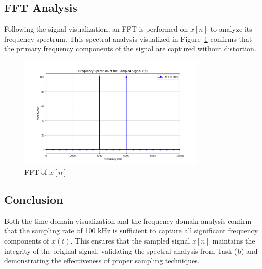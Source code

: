 \subsection*{FFT Analysis}
Following the signal visualization, an FFT is performed on $x[n]$ to analyze its frequency spectrum.
This spectral analysis visualized in Figure~\ref{fig:ex1c_fft_analysis} confirms that the primary frequency components of the signal are captured without distortion.

\begin{figure}[h]
    \centering
    \includegraphics[width=0.8\textwidth]{fig/ex1_c_fft_plot}
    \caption{FFT of $x[n]$}
    \label{fig:ex1c_fft_analysis}
\end{figure}

\subsection*{Conclusion}
Both the time-domain visualization and the frequency-domain analysis confirm that the sampling rate of 100 kHz is sufficient to capture all significant frequency components of $x(t)$. This ensures that the sampled signal $x[n]$ maintains the integrity of the original signal, validating the spectral analysis from Task (b) and demonstrating the effectiveness of proper sampling techniques.
